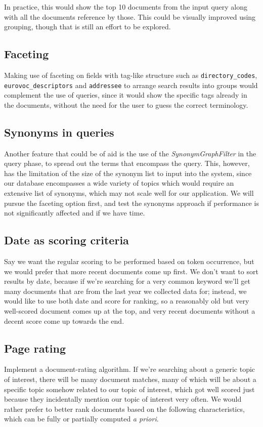 \documentclass[sigconf, authorversion]{acmart}
\begin{document}
In practice, this would show the top 10 documents from the input query along with all the documents reference by those. This could be visually improved using grouping, though that is still an effort to be explored.

\subsection{Faceting}
Making use of faceting on fields with tag-like structure such as \texttt{directory\_codes}, \texttt{eurovoc\_descriptors} and \texttt{addressee} to arrange search results into groups would complement the use of queries, since it would show the specific tags already in the documents, without the need for the user to guess the correct terminology.

\subsection{Synonyms in queries}
Another feature that could be of aid is the use of the \textit{SynonymGraphFilter} in the query phase, to spread out the terms that encompass the query. This, however, has the limitation of the size of the synonym list to input into the system, since our database encompasses a wide variety of topics which would require an extensive list of synonyms, which may not scale well for our application. We will pursue the faceting option first, and test the synonyms approach if performance is not significantly affected and if we have time.

\subsection{Date as scoring criteria}
Say we want the regular scoring to be performed based on token occurrence, but we would prefer that more recent documents come up first. We don't want to sort results by date, because if we're searching for a very common keyword we'll get many documents that are from the last year we collected data for; instead, we would like to use both date and score for ranking, so a reasonably old but very well-scored document comes up at the top, and very recent documents without a decent score come up towards the end.

\subsection{Page rating}
Implement a document-rating algorithm. If we're searching about a generic topic of interest, there will be many document matches, many of which will be about a specific topic somehow related to our topic of interest, which got well scored just because they incidentally mention our topic of interest very often. We would rather prefer to better rank documents based on the following characteristics, which can be fully or partially computed \textit{a priori}.
\end{document}
